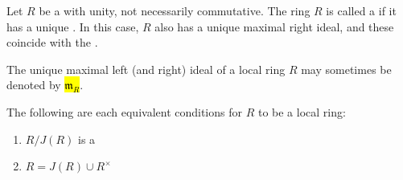 \begin{definition} \label{definition:local_ring}
Let $R$ be a  with unity, not necessarily commutative.  
The ring $R$ is called a  if it has a unique . In this case, $R$ also has a unique maximal right ideal, and these coincide with the .  

The unique maximal left (and right) ideal of a local ring $R$ may sometimes be denoted by \hl{$\mathfrak{m}_R$}.

The following are each equivalent conditions for $R$ to be a local ring:
\begin{enumerate}
    \item $R/J(R)$ is a 
    \item $R = J(R) \cup R^\times$
\end{enumerate}
\end{definition}

